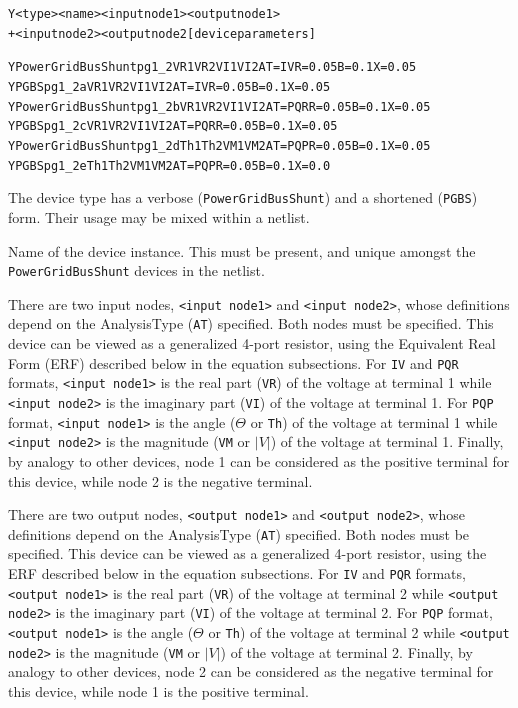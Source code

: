 \begin{Device}\label{PowerGridBusShunt}

\device
\begin{alltt}
Y<type> <name> <input node1> <output node1> 
+ <input node2> <output node2 [device parameters] 
\end{alltt}
  
\examples
\begin{alltt}
YPowerGridBusShunt pg1_2 VR1 VR2 VI1 VI2 AT=IV R=0.05 B=0.1 X=0.05
YPGBS pg1_2a VR1 VR2 VI1 VI2 AT=IV R=0.05 B=0.1 X=0.05
YPowerGridBusShunt pg1_2b VR1 VR2 VI1 VI2 AT=PQR R=0.05 B=0.1 X=0.05
YPGBS pg1_2c VR1 VR2 VI1 VI2 AT=PQR R=0.05 B=0.1 X=0.05
YPowerGridBusShunt pg1_2d Th1 Th2 VM1 VM2 AT=PQP R=0.05 B=0.1 X=0.05
YPGBS pg1_2e Th1 Th2 VM1 VM2 AT=PQP R=0.05 B=0.1 X=0.0
\end{alltt}

\parameters 
\begin{Parameters}
The device type has a verbose (\texttt{PowerGridBusShunt}) and a shortened
(\texttt{PGBS}) form.  Their usage may be mixed within a netlist.

Name of the device instance.  This must be present, and unique amongst the 
\texttt{PowerGridBusShunt} devices in the netlist.

There are two input nodes, \texttt{<input node1>} and \texttt{<input node2>}, 
whose definitions depend on the AnalysisType (\texttt{AT}) specified.  Both nodes
must be specified.  This device can be viewed as a generalized 4-port resistor, using
the Equivalent Real Form (ERF) described below in the equation subsections. For 
\texttt{IV} and \texttt{PQR} formats, \texttt{<input node1>} is the real part 
(\texttt{VR}) of the voltage at terminal 1 while \texttt{<input node2>} is the 
imaginary part (\texttt{VI}) of the voltage at terminal 1.  
For \texttt{PQP} format, \texttt{<input node1>} is the angle ($\Theta$ or \texttt{Th}) of the voltage 
at terminal 1 while \texttt{<input node2>} is the magnitude (\texttt{VM} or $|V|$) of the 
voltage at terminal 1.  Finally, by analogy to other \Xyce{} devices, node 1 can be 
considered as the positive terminal for this device, while node 2 is the negative
terminal.

There are two output nodes, \texttt{<output node1>} and \texttt{<output node2>}, 
whose definitions depend on the AnalysisType (\texttt{AT}) specified.  Both nodes
must be specified.  This device can be viewed as a generalized 4-port resistor, 
using the ERF described below in the equation subsections. For \texttt{IV} 
and \texttt{PQR} formats, \texttt{<output node1>} is the real part (\texttt{VR}) of 
the voltage at terminal 2 while \texttt{<output node2>} is the imaginary part 
(\texttt{VI}) of the voltage at terminal 2.  
For \texttt{PQP} format, \texttt{<output node1>} is the angle ($\Theta$ or \texttt{Th}) of the voltage 
at terminal 2 while \texttt{<output node2>} is the magnitude (\texttt{VM} or $|V|$) of the 
voltage at terminal 2.  Finally, by analogy to other \Xyce{} devices, node 2 can be 
considered as the negative terminal for this device, while node 1 is the positive
terminal.
  

\end{Parameters}
\end{Device}
